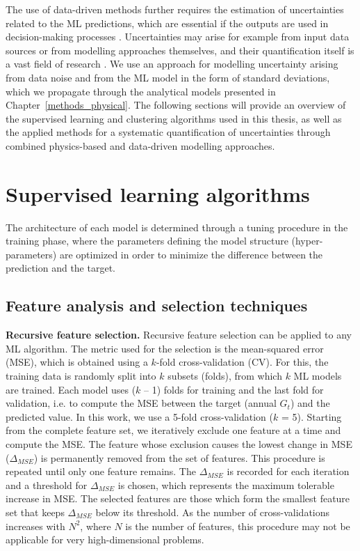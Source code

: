 The use of data-driven methods further requires the estimation of uncertainties related to the ML predictions, which are essential if the outputs are used in decision-making processes \cite{knusel_argument-based_2020}. 
Uncertainties may arise for example from input data sources or from modelling approaches themselves, and their quantification itself is a vast field of research \cite{willard_integrating_2020,knusel_argument-based_2020}.
We use an approach for modelling uncertainty arising from data noise and from the ML model in the form of standard deviations, which we propagate through the analytical models presented in Chapter~\ref{methods_physical}. 
The following sections will provide an overview of the supervised learning and clustering algorithms used in this thesis, as well as the applied methods for a systematic quantification of uncertainties through combined physics-based and data-driven modelling approaches.

\section{Supervised learning algorithms}
\label{ML_supervised}
The architecture of each model is determined through a tuning procedure in the training phase, where the parameters defining the model structure (hyper-parameters) are optimized in order to minimize the difference between the prediction and the target. 

\subsection{Feature analysis and selection techniques}
\label{ML_features}

\textbf{Recursive feature selection.} Recursive feature selection can be applied to any ML algorithm. The metric used for the selection is the mean-squared error (MSE), which is obtained using a $k$-fold cross-validation (CV). For this, the training data is randomly split into $k$ subsets (folds), from which $k$ ML models are trained. Each model uses ($k$ – 1) folds for training and the last fold for validation, i.e. to compute the MSE between the target (annual $G_t$) and the predicted value. In this work, we use a 5-fold cross-validation ($k$ = 5). 
Starting from the complete feature set, we iteratively exclude one feature at a time and compute the MSE. The feature whose exclusion causes the lowest change in MSE ($\Delta_{MSE}$) is permanently removed from the set of features. This procedure is repeated until only one feature remains. The $\Delta_{MSE}$ is recorded for each iteration and a threshold for $\Delta_{MSE}$ is chosen, which represents the maximum tolerable increase in MSE. The selected features are those which form the smallest feature set that keeps $\Delta_{MSE}$ below its threshold. As the number of cross-validations increases with $N^2$, where $N$ is the number of features, this procedure may not be applicable for very high-dimensional problems.


